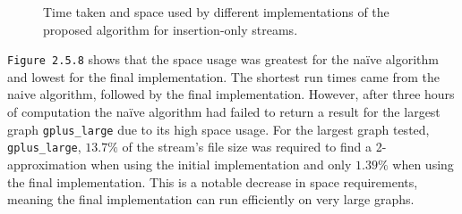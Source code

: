 \documentclass[11pt,twoside,a4paper]{report}
\begin{document}
\begin{figure}[H]
	\label{Figure 12}
	\newline
	\caption{Time taken and space used by different implementations of the proposed algorithm for insertion-only streams.}
\end{figure}

\par \texttt{Figure 2.5.8} shows that the space usage was greatest for the naïve algorithm and lowest for the final implementation. The shortest run times came from the naive algorithm, followed by the final implementation. However, after three hours of computation the naïve algorithm had failed to return a result for the largest graph \texttt{gplus\_large} due to its high space usage. For the largest graph tested, \texttt{gplus\_large}, $13.7\%$ of the stream's file size was required to find a 2-approximation when using the initial implementation and only $1.39\%$ when using the final implementation. This is a notable decrease in space requirements, meaning the final implementation can run efficiently on very large graphs.
\end{document}

